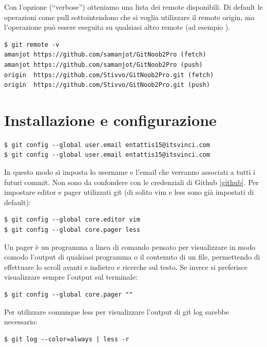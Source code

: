 \documentclass{article} \usepackage[textwidth=19cm,textheight=24cm]{geometry}
\begin{document}
Con l'opzione  (``verbose'') otteniamo una lista dei remote disponibili.
Di default le operazioni come pull sottointendono che si voglia utilizzare il 
remote origin, ma l'operazione può essere eseguita su qualsiasi altro remote
(ad esempio ).

\begin{verbatim}
$ git remote -v
amanjot	https://github.com/samanjot/GitNoob2Pro (fetch)
amanjot	https://github.com/samanjot/GitNoob2Pro (push)
origin	https://github.com/Stivvo/GitNoob2Pro.git (fetch)
origin	https://github.com/Stivvo/GitNoob2Pro.git (push)
\end{verbatim}

\section{Installazione e configurazione\label{configurazione}}

\begin{verbatim}
$ git config --global user.email entattis15@itsvinci.com
$ git config --global user.email entattis15@itsvinci.com
\end{verbatim}

In questo modo si imposta lo username e l'email che verranno associati a tutti i
futuri commit. Non sono da confondere con le credenziali di Github \ref{github}.
Per impostare editor e pager utilizzati git (di solito vim e less sono già 
impostati di default):

\begin{verbatim}
$ git config --global core.editor vim
$ git config --global core.pager less
\end{verbatim}

Un pager è un programma a linea di comando pensato per visualizzare in modo comodo
l'output di qualsiasi programma o il contenuto di un file, permettendo di
effettuare lo scroll avanti e indietro e ricerche sul testo.
Se invece si preferisce visualizzare sempre l'output sul terminale:

\begin{verbatim}
$ git config --global core.pager ""
\end{verbatim}

Per utilizzare comunque less per visualizzare l'output di git log sarebbe
necessario:

\begin{verbatim}
$ git log --color=always | less -r 
\end{verbatim}
\end{document}

